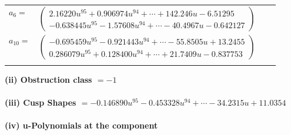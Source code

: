\documentclass[1p]{elsarticle_modified}
\theoremstyle{definition}
\begin{document}
\begin{tabular}{m{7pt} m{180pt} m{7pt} m{180pt} }
\flushright $a_{6}=$&$\begin{pmatrix}2.16220 u^{95}+0.906974 u^{94}+\cdots+142.246 u-6.51295\\-0.638445 u^{95}-1.57608 u^{94}+\cdots-40.4967 u-0.642127\end{pmatrix}$ \\
\flushright $a_{10}=$&$\begin{pmatrix}-0.695459 u^{95}-0.921443 u^{94}+\cdots-55.8505 u+13.2455\\0.286079 u^{95}+0.128400 u^{94}+\cdots+21.7409 u-0.837753\end{pmatrix}$\\&\end{tabular}
\flushleft \textbf{(ii) Obstruction class $= -1$}\\~\\
\flushleft \textbf{(iii) Cusp Shapes $= -0.146890 u^{95}-0.453328 u^{94}+\cdots-34.2315 u+11.0354$}\\~\\
\newpage\renewcommand{\arraystretch}{1}
\flushleft \textbf{(iv) u-Polynomials at the component}\newline \\
\end{document}

